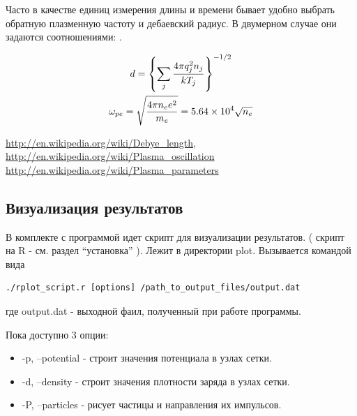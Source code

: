 Часто в качестве единиц измерения длины и времени бывает удобно выбрать
обратную плазменную частоту и дебаевский радиус. В двумерном случае
они задаются соотношениями: .

\begin{gather}
  d = \left\{ \sum_j {4\pi q^2_j n_j \over kT_j} \right\}^{-1/2}
  \\
  \omega_{pe} = \sqrt{4\pi n_e e^2 \over m_e} = 5.64 \times 10^4 \sqrt{n_e}
\end{gather}

\url{http://en.wikipedia.org/wiki/Debye_length}, 
\url{http://en.wikipedia.org/wiki/Plasma_oscillation}
\url{http://en.wikipedia.org/wiki/Plasma_parameters}

\subsection{ Визуализация результатов }

В комплекте с программой идет скрипт для визуализации результатов.
( скрипт на R - см. раздел ``установка'' ).
Лежит в директории plot. Вызывается командой вида
\begin{verbatim}
./rplot_script.r [options] /path_to_output_files/output.dat
\end{verbatim}
где output.dat - выходной фаил, полученный при работе программы.

Пока доступно 3 опции: 
\begin{itemize}
\item -p, --potential - строит значения потенциала в узлах сетки.
\item -d, --density - строит значения плотности заряда в узлах сетки.
\item -P, --particles - рисует частицы и направления их импульсов.
\end{itemize}

